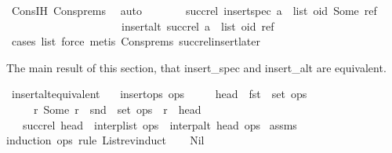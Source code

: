 \begin{isabellebody}
\ Cons{\isachardot}IH\ Cons{\isachardot}prems\ \isamarkupfalse%
\ auto\isanewline
\ \ \ \ \isamarkupfalse%
\ \isamarkupfalse%
\ {\isachardoublequoteopen}succ{\isacharunderscore}rel\ {\isacharparenleft}insert{\isacharunderscore}spec\ {\isacharparenleft}a\ {\isacharhash}\ list{\isacharparenright}\ {\isacharparenleft}oid{\isacharcomma}\ Some\ ref{\isacharparenright}{\isacharparenright}\ {\isacharequal}\isanewline
\ \ \ \ \ \ \ \ \ \ \ \ \ \ \ \ \ \ \ \ \ insert{\isacharunderscore}alt\ {\isacharparenleft}succ{\isacharunderscore}rel\ {\isacharparenleft}a\ {\isacharhash}\ list{\isacharparenright}{\isacharparenright}\ {\isacharparenleft}oid{\isacharcomma}\ ref{\isacharparenright}{\isachardoublequoteclose}\isanewline
\ \ \ \ \ \ \isamarkupfalse%
\ {\isacharparenleft}cases\ list{\isacharcomma}\ force{\isacharcomma}\ metis\ Cons{\isachardot}prems\ succ{\isacharunderscore}rel{\isacharunderscore}insert{\isacharunderscore}later{\isacharparenright}\isanewline
\ \ \isamarkupfalse%
\isanewline
{}\isamarkupfalse%
%
\endisatagproof
{\isafoldproof}%
%
\isadelimproof
%
\endisadelimproof
%
\begin{isamarkuptext}%
The main result of this section, that insert\_spec and insert\_alt
are equivalent.%
\end{isamarkuptext}\isamarkuptrue%
\isamarkupfalse%
\ insert{\isacharunderscore}alt{\isacharunderscore}equivalent{\isacharcolon}\isanewline
\ \ \ {\isachardoublequoteopen}insert{\isacharunderscore}ops\ ops{\isachardoublequoteclose}\isanewline
\ \ \ \ \ {\isachardoublequoteopen}head\ {\isasymnotin}\ fst\ {\isacharbackquote}\ set\ ops{\isachardoublequoteclose}\isanewline
\ \ \ \ \ {\isachardoublequoteopen}{\isasymAnd}r{\isachardot}\ Some\ r\ {\isasymin}\ snd\ {\isacharbackquote}\ set\ ops\ {\isasymLongrightarrow}\ r\ {\isasymnoteq}\ head{\isachardoublequoteclose}\isanewline
\ \ \ {\isachardoublequoteopen}succ{\isacharunderscore}rel\ {\isacharparenleft}head\ {\isacharhash}\ interp{\isacharunderscore}list\ ops{\isacharparenright}\ {\isacharequal}\ interp{\isacharunderscore}alt\ head\ ops{\isachardoublequoteclose}\isanewline
%
\isadelimproof
%
\endisadelimproof
%
\isatagproof
{}\isamarkupfalse%
\ assms\ \isamarkupfalse%
{\isacharparenleft}induction\ ops\ rule{\isacharcolon}\ List{\isachardot}rev{\isacharunderscore}induct{\isacharparenright}\isanewline
\ \ \isamarkupfalse%
\ Nil\isanewline

\end{isabellebody}
